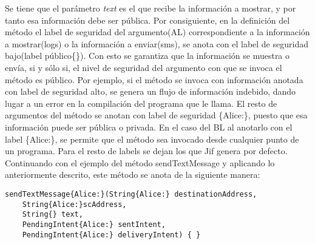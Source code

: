 Se tiene que el parámetro \emph{text} es el que recibe la información a mostrar,
y por tanto esa información debe ser pública.\newline 
Por consiguiente, en la definición del método el label de seguridad del
argumento(AL) correspondiente a la información a mostrar(logs) o la información
a enviar(sms), se anota con el label de seguridad bajo(label público\{\}). Con
esto se garantiza que la información se muestra o envía, si y sólo si, el nivel
de seguridad del argumento con que se invoca el método es público. Por ejemplo,
si el método se invoca con información anotada con label de seguridad alto, se
genera un flujo de información indebido, dando lugar a un error en la
compilación del programa que le llama.\newline 
El resto de argumentos del método se anotan con label de seguridad \{Alice:\},
puesto que esa información puede ser pública o privada.\newline
En el caso del BL al anotarlo con el label \{Alice:\}, se permite que el método
sea invocado desde cualquier punto de un programa. 
Para el resto de labels se dejan los que Jif genera por defecto.\newline
Continuando con el ejemplo del método sendTextMessage y aplicando lo
anteriormente descrito, este método se anota de la siguiente manera:
\begin{lstlisting}
sendTextMessage{Alice:}(String{Alice:} destinationAddress, 
	String{Alice:}scAddress, 
	String{} text, 
	PendingIntent{Alice:} sentIntent,
	PendingIntent{Alice:} deliveryIntent) { }
\end{lstlisting}





















